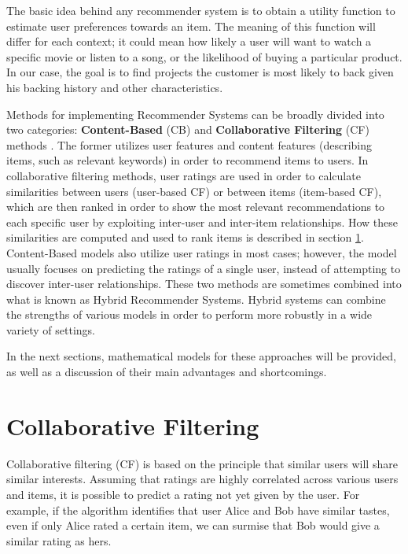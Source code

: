 \documentclass[cic,tc,english]{iiufrgs}
\begin{document}
The basic idea behind any recommender system is to obtain a utility function to estimate user preferences towards an item. The meaning of this function will differ for each context; it could mean how likely a user will want to watch a specific movie or listen to a song, or the likelihood of buying a particular product. In our case, the goal is to find projects the customer is most likely to back given his backing history and other characteristics. 

Methods for implementing Recommender Systems can be broadly divided into two categories: \textbf{Content-Based} (CB) and \textbf{Collaborative Filtering} (CF) methods \cite{Rakesh2016}.
The former utilizes user features and content features (describing items, such as relevant keywords) in order to recommend items to users. In collaborative filtering methods, user ratings are used in order to calculate similarities between users (user-based CF) or between items (item-based CF), which are then ranked in order to show the most relevant recommendations to each specific user by exploiting inter-user and inter-item relationships. How these similarities are computed and used to rank items is described in section \ref{cf}. Content-Based models also utilize user ratings in most cases; however, the model usually focuses on predicting the ratings of a single user, instead of attempting to discover inter-user relationships. These two methods are sometimes combined into what is known as Hybrid Recommender Systems. Hybrid systems can combine the strengths of various models in order to perform more robustly in a wide variety of settings.

In the next sections, mathematical models for these approaches will be provided, as well as a discussion of their main advantages and shortcomings.

\section{Collaborative Filtering} \label{cf}
Collaborative filtering (CF) is based on the principle that similar users will share similar interests. Assuming that ratings are highly correlated across various users and items, it is possible to predict a rating not yet given by the user. For example, if the algorithm identifies that user Alice and Bob have similar tastes, even if only Alice rated a certain item, we can surmise that Bob would give a similar rating as hers. 
\end{document}
